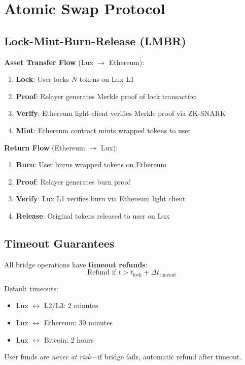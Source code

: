 \section{Atomic Swap Protocol}


\subsection{Lock-Mint-Burn-Release (LMBR)}

\textbf{Asset Transfer Flow} (Lux $\to$ Ethereum):

\begin{enumerate}
  \item \textbf{Lock}: User locks $N$ tokens on Lux L1
  \item \textbf{Proof}: Relayer generates Merkle proof of lock transaction
  \item \textbf{Verify}: Ethereum light client verifies Merkle proof via ZK-SNARK
  \item \textbf{Mint}: Ethereum contract mints wrapped tokens to user
\end{enumerate}

\textbf{Return Flow} (Ethereum $\to$ Lux):
\begin{enumerate}
  \item \textbf{Burn}: User burns wrapped tokens on Ethereum
  \item \textbf{Proof}: Relayer generates burn proof
  \item \textbf{Verify}: Lux L1 verifies burn via Ethereum light client
  \item \textbf{Release}: Original tokens released to user on Lux
\end{enumerate}

\subsection{Timeout Guarantees}

All bridge operations have \textbf{timeout refunds}:
\begin{equation}
\text{Refund if } t > t_{\text{lock}} + \Delta t_{\text{timeout}}
\end{equation}

Default timeouts:
\begin{itemize}[leftmargin=1.1em]
  \item Lux $\leftrightarrow$ L2/L3: 2 minutes
  \item Lux $\leftrightarrow$ Ethereum: 30 minutes
  \item Lux $\leftrightarrow$ Bitcoin: 2 hours
\end{itemize}

User funds are \emph{never at risk}---if bridge fails, automatic refund after timeout.

